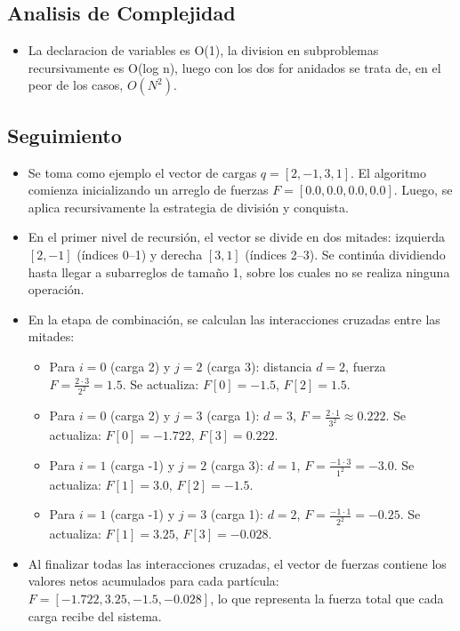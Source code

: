 \documentclass[a4paper, 12pt]{article}
\begin{document}
\subsection{Analisis de Complejidad}
\begin{itemize}
    \item La declaracion de variables es O(1), la division en subproblemas recursivamente es O(log n), luego con los dos for anidados se trata de, en el peor de los casos, \(O(N^2)\). 
\end{itemize}
\subsection{Seguimiento}
\begin{itemize}
\item Se toma como ejemplo el vector de cargas \( q = [2, -1, 3, 1] \). El algoritmo comienza inicializando un arreglo de fuerzas \( F = [0.0, 0.0, 0.0, 0.0] \). Luego, se aplica recursivamente la estrategia de división y conquista.

\item En el primer nivel de recursión, el vector se divide en dos mitades: izquierda \([2, -1]\) (índices 0–1) y derecha \([3, 1]\) (índices 2–3). Se continúa dividiendo hasta llegar a subarreglos de tamaño 1, sobre los cuales no se realiza ninguna operación.

\item En la etapa de combinación, se calculan las interacciones cruzadas entre las mitades:
\begin{itemize}
    \item Para \(i = 0\) (carga 2) y \(j = 2\) (carga 3): distancia \(d = 2\), fuerza \(F = \frac{2 \cdot 3}{2^2} = 1.5\). Se actualiza: \(F[0] = -1.5\), \(F[2] = 1.5\).
    \item Para \(i = 0\) (carga 2) y \(j = 3\) (carga 1): \(d = 3\), \(F = \frac{2 \cdot 1}{3^2} \approx 0.222\). Se actualiza: \(F[0] = -1.722\), \(F[3] = 0.222\).
    \item Para \(i = 1\) (carga -1) y \(j = 2\) (carga 3): \(d = 1\), \(F = \frac{-1 \cdot 3}{1^2} = -3.0\). Se actualiza: \(F[1] = 3.0\), \(F[2] = -1.5\).
    \item Para \(i = 1\) (carga -1) y \(j = 3\) (carga 1): \(d = 2\), \(F = \frac{-1 \cdot 1}{2^2} = -0.25\). Se actualiza: \(F[1] = 3.25\), \(F[3] = -0.028\).
\end{itemize}

\item Al finalizar todas las interacciones cruzadas, el vector de fuerzas contiene los valores netos acumulados para cada partícula: \( F = [-1.722, 3.25, -1.5, -0.028] \), lo que representa la fuerza total que cada carga recibe del sistema.


\end{itemize}
\end{document}
